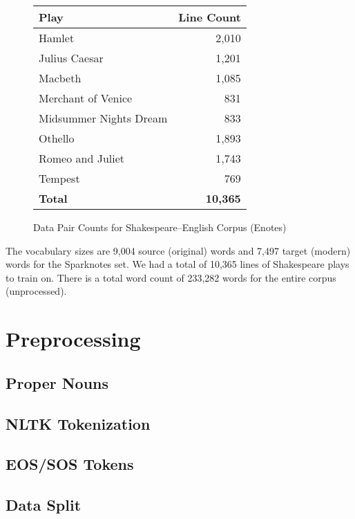\documentclass[twoside,twocolumn]{article}
\begin{document}
\begin{figure}[ht]
    \centering
    \begin{tabular}{ |l|r| }
        \hline
        \textbf{Play}
          & \textbf{Line Count} \\
        \hline
        Hamlet & 2,010 \\ \hline
        Julius Caesar & 1,201 \\ \hline
        Macbeth & 1,085 \\ \hline
        Merchant of Venice & 831 \\ \hline
        Midsummer Nights Dream & 833 \\ \hline
        Othello & 1,893 \\ \hline
        Romeo and Juliet & 1,743 \\ \hline
        Tempest & 769 \\ \hline
        \textbf{Total} & \textbf{10,365} \\ \hline
    \end{tabular}

    \caption{Data Pair Counts for Shakespeare--English Corpus (Enotes)}
    \label{fig:data-lines-enotes}
\end{figure}

The vocabulary sizes are 9,004 source (original) words and
7,497 target (modern) words for the Sparknotes set. We had a total of 10,365
lines of Shakespeare plays to train on. There is a total word count of 233,282
words for the entire corpus (unprocessed).
\section{Preprocessing}
\label{sec:preprocess}
\subsection{Proper Nouns}
\subsection{NLTK Tokenization}
\subsection{EOS/SOS Tokens}
\subsection{Data Split}
\end{document}

